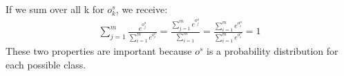 \documentclass[12pt]{article}
\begin{document}
If we sum over all k for $o^s_k$, we receive:
\begin{align*}
\sum\limits_{j=1}^m \frac{e^{o^a_j}}{\sum\limits_{i=1}^m e^{o^a_i}} = \frac{\sum\limits_{j=1}^m e^{o^a_j}}{\sum\limits_{i=1}^m} = \frac{\sum\limits_{i=1}^m e^{o^a_i}}{\sum\limits_{i=1}^m e^{o^a_i}} = 1
\end{align*}
These two properties are important because $o^s$ is a probability distribution for each possible class.
\subsection{}
\subsection{}
\subsection{}
\subsection{}
\subsection{}
\subsection{}
\subsection{}
\subsection{}
\subsection{}
\subsection{}
\subsection{}
\subsection{}
\subsection{}
\subsection{}
\end{document}
